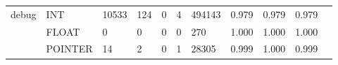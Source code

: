 \begin{table}
\begin{tabular}{lp{1.43cm}p{1.10cm}p{1.10cm}p{1.10cm}p{1.10cm}p{1.10cm}p{1.10cm}p{1.10cm}p{1.10cm}p{1.10cm}}
\cline{1-10}
\multirow{3}{*}{debug} & INT &                              10533 &                               124 &                                0 &                                 4 &                          494143 &                     0.979 &                                 0.979 &                               0.979 \\
      & FLOAT &                                  0 &                                 0 &                                0 &                                 0 &                             270 &                     1.000 &                                 1.000 &                               1.000 \\
      & POINTER &                                 14 &                                 2 &                                0 &                                 1 &                           28305 &                     0.999 &                                 1.000 &                               0.999 \\
\bottomrule
\end{tabular}
\end{table}
